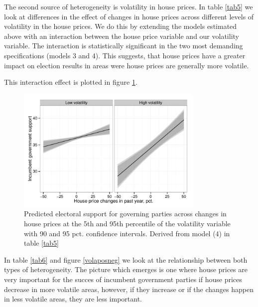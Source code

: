 \documentclass[12pt,a4paper]{article}
\begin{document}
The second source of heterogeneity is volatility in house prices. In table \ref{tab5} we look at differences in the effect of changes in house prices across different levels of volatility in the house prices.  We do this by extending the models estimated above with an interaction between the house price variable and our volatility variable. The interaction is statistically significant in the two most demanding specifications (models 3 and 4). This suggests, that house prices have a greater impact on election results in areas were house prices are generally more volatile. 



This interaction effect is plotted in figure \ref{vola}.

\begin{figure}[htbp]
	\includegraphics[page=1,width=0.8\textwidth]{../figures/volaplot}
	\centering
	\caption{Predicted electoral support for governing parties across changes in house prices at the 5th and 95th percentile of the volatility variable with 90 and 95 pct. confidence intervals. Derived from model (4) in table \ref{tab5}}
	\label{vola}
\end{figure}


In table \ref{tab6} and figure \ref{volaposneg} we look at the relationship between both types of heterogeneity. The picture which emerges is one where house prices are very important for the succes of incumbent government parties if house prices decrease in more volatile areas, however, if they increase or if the changes happen in less volatile areas, they are less important.


\end{document}
